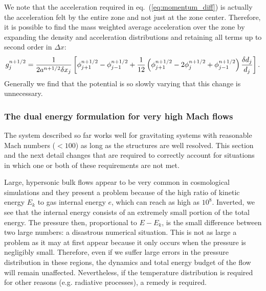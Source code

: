We note that the acceleration required in eq.~(\ref{eq:momentum_diff}) is actually the
acceleration felt by the entire zone and not just at the zone center.
Therefore, it is possible to find the mass weighted average acceleration over the zone
by expanding the density and acceleration distributions and
retaining all terms up to second order in $\Delta x$:
%
\begin{equation}
g_j^{n+1/2} = 
       \frac{1}{2 a^{n+1/2} \delta x_j} \left[ 
             \phi_{j+1}^{n+1/2} 
           - \phi_{j-1}^{n+1/2} 
           + \frac{1}{12} \left(    \phi^{n+1/2}_{j+1} 
                                 - 2\phi^{n+1/2}_j 
                                 + \phi^{n+1/2}_{j-1} \right) 
                                   {\delta d_j \over d_j}
       \right].
       \label{eq:accel}
\end{equation}
Generally we find that the potential is so slowly varying that this change is unnecessary.


\subsubsection{The dual energy formulation for  very high Mach flows} %

The system described so far works well for gravitating systems with
reasonable Mach numbers ($<100$) as long as the structures are well resolved.
This section and the next detail changes that are required
to correctly account for situations in which one or both of these
requirements are not met.

Large, hypersonic bulk flows appear to be very common in cosmological
simulations and they present a problem because of the high ratio of
kinetic energy $E_k$ to gas internal energy $e$, which can reach as
high as $10^8$.  Inverted, we see that the internal energy consists of
an extremely small portion of the total energy.  The pressure then,
proportional to $E - E_{k}$, is the small difference between two large
numbers: a disastrous numerical situation.  This is not as large a
problem as it may at first appear because it only occurs when the
pressure is negligibly small.  Therefore, even if we suffer large
errors in the pressure distribution in these regions, the dynamics and
total energy budget of the flow will remain unaffected.  Nevertheless,
if the temperature distribution is required for other reasons
(e.g. radiative processes), a remedy is required.

